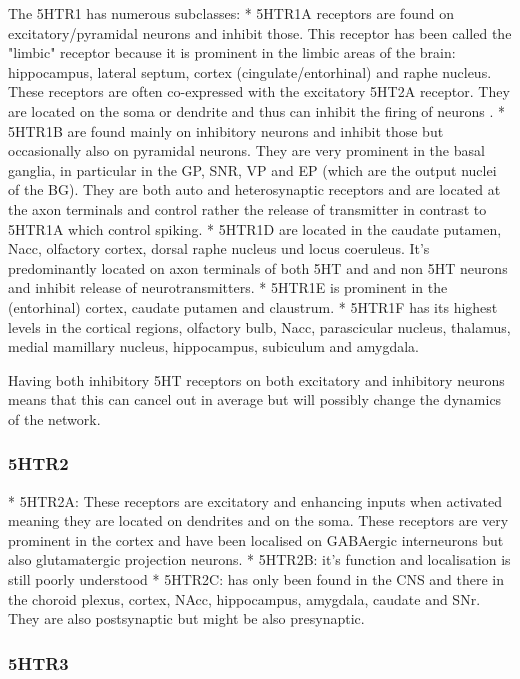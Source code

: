 \documentclass[12pt,a4paper]{article}
\begin{document}
The 5HTR1 has numerous subclasses:
  * 5HTR1A receptors are found on excitatory/pyramidal neurons and inhibit those. This receptor has been called the "limbic" receptor because it is prominent in the limbic areas of the brain: hippocampus, lateral septum, cortex (cingulate/entorhinal) and raphe nucleus. These receptors are often co-expressed with the excitatory 5HT2A receptor. They are located on the soma or dendrite and thus can inhibit the firing of neurons \citep{Riad2000}.
  * 5HTR1B are found mainly on inhibitory neurons and inhibit those but occasionally also on pyramidal neurons. They are very prominent in the basal ganglia, in particular in the GP, SNR, VP and EP (which are the output nuclei of the BG). They are both auto and heterosynaptic receptors and are located at the axon terminals \citep{Riad2000} and control rather the release of transmitter in contrast to 5HTR1A which control spiking.
  * 5HTR1D are located in the caudate putamen, Nacc, olfactory cortex, dorsal raphe nucleus und locus coeruleus. It's predominantly located on axon terminals of both 5HT and and non 5HT neurons and inhibit release of neurotransmitters.
  * 5HTR1E is prominent in the (entorhinal) cortex, caudate putamen and claustrum.
  * 5HTR1F has its highest levels in the cortical regions, olfactory bulb, Nacc, parascicular nucleus, thalamus, medial mamillary nucleus, hippocampus, subiculum and amygdala.

Having both inhibitory 5HT receptors on both excitatory and inhibitory neurons means that this can cancel out in average but will possibly change the dynamics of the network.

\subsubsection{5HTR2}

  * 5HTR2A: These receptors are excitatory and enhancing inputs when activated meaning they are located on dendrites and on the soma. These receptors are very prominent in the cortex and have been localised on GABAergic interneurons but also glutamatergic projection neurons.
  * 5HTR2B: it's function and localisation is still poorly understood
  * 5HTR2C: has only been found in the CNS and there in the choroid plexus, cortex, NAcc, hippocampus, amygdala, caudate and SNr. They are also postsynaptic but might be also presynaptic.

\subsubsection{5HTR3}
\end{document}

